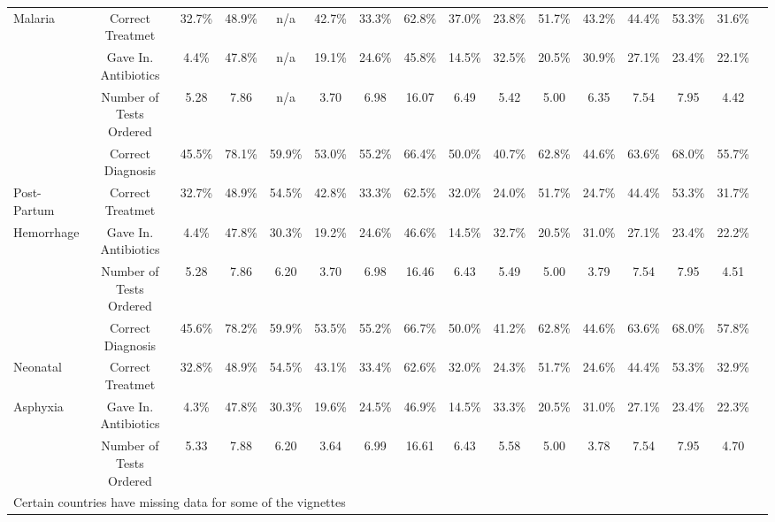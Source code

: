 \begin{tabular}{l*{15}{c}}
Malaria&                           {Correct Treatmet}&                 {32.7\%}&      {48.9\%}&      {n/a}&          {42.7\%}&      {33.3\%}&      {62.8\%}&      {37.0\%}&      {23.8\%}&      {51.7\%}&      {43.2\%}&     {44.4\%}&     {53.3\%}&     {31.6\%}\\
 &                                     {Gave In. Antibiotics}&         {4.4\%}&      {47.8\%}&  {n/a}&      {19.1\%}&      {24.6\%}&      {45.8\%}&      {14.5\%}&      {32.5\%}&      {20.5\%}&      {30.9\%}&     {27.1\%}&     {23.4\%}&     {22.1\%}\\
 &                                     {Number of Tests Ordered}&  {5.28}&    {7.86}&    {n/a}&      {3.70}&        {6.98}&        {16.07}&        {6.49}&        {5.42}&        {5.00}&        {6.35}&       {7.54}&       {7.95}&       {4.42}\\
\hline
 &                                     {Correct Diagnosis}&            {45.5\%}&      {78.1\%}&  {59.9\%}&  {53.0\%}&      {55.2\%}&      {66.4\%}&      {50.0\%}&      {40.7\%}&      {62.8\%}&      {44.6\%}&     {63.6\%}&     {68.0\%}&     {55.7\%}\\
Post-Partum&           {Correct Treatmet}&             {32.7\%}&      {48.9\%}&      {54.5\%}&  {42.8\%}&  {33.3\%}&      {62.5\%}&      {32.0\%}&      {24.0\%}&      {51.7\%}&      {24.7\%}&     {44.4\%}&     {53.3\%}&     {31.7\%}\\
Hemorrhage&                {Gave In. Antibiotics}&     {4.4\%}&      {47.8\%}&  {30.3\%}&  {19.2\%}&      {24.6\%}&      {46.6\%}&      {14.5\%}&      {32.7\%}&      {20.5\%}&      {31.0\%}&     {27.1\%}&     {23.4\%}&     {22.2\%}\\
 &                                     {Number of Tests Ordered}&  {5.28}&    {7.86}&    {6.20}&    {3.70}&        {6.98}&        {16.46}&        {6.43}&        {5.49}&        {5.00}&        {3.79}&       {7.54}&       {7.95}&       {4.51}\\
\hline
 &                                     {Correct Diagnosis}&            {45.6\%}&     {78.2\%}& {59.9\%}& {53.5\%}&     {55.2\%}&     {66.7\%}&     {50.0\%}&     {41.2\%}&     {62.8\%}&     {44.6\%}& {63.6\%}& {68.0\%}&  {57.8\%}\\
Neonatal&                      {Correct Treatmet}&             {32.8\%}&     {48.9\%}& {54.5\%}& {43.1\%}&     {33.4\%}&     {62.6\%}&     {32.0\%}&     {24.3\%}&     {51.7\%}&     {24.6\%}& {44.4\%}& {53.3\%}&  {32.9\%}\\
Asphyxia&                          {Gave In. Antibiotics}&     {4.3\%}&     {47.8\%}& {30.3\%}& {19.6\%}&     {24.5\%}&     {46.9\%}&     {14.5\%}&     {33.3\%}&     {20.5\%}&     {31.0\%}& {27.1\%}& {23.4\%}&  {22.3\%}\\
 &                                     {Number of Tests Ordered}&  {5.33}&   {7.88}&   {6.20}&   {3.64}&       {6.99}&       {16.61}&       {6.43}&       {5.58}&       {5.00}&       {3.78}&       {7.54}&       {7.95}&    {4.70}\\
\hline\hline
\multicolumn{15}{l}{\footnotesize Certain countries have missing data for some of the vignettes}\\
\end{tabular}